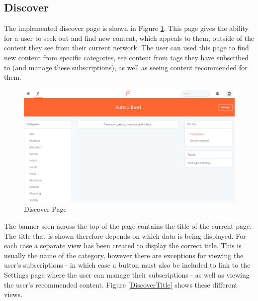 \subsection{Discover}
The implemented discover page is shown in Figure \ref{fig:DiscoverPage}. This page gives the ability for a user to seek out and find new content, which appeals to them, outside of the content they see from their current network. The user can used this page to find new content from specific categories, see content from tags they have subscribed to (and manage these subscriptions), as well as seeing content recommended for them.

\begin{figure}[H]
\centering
\includegraphics[width=\textwidth]{Images/Implementation/DiscoverPage}
\caption{Discover Page}
\label{fig:DiscoverPage}
\end{figure}
The banner seen across the top of the page contains the title of the current page. The title that is shown therefore depends on which data is being displayed. For each case a separate view has been created to display the correct title. This is usually the name of the category, however there are exceptions for viewing the user's subscriptions - in which case a button must also be included to link to the Settings page where the user can manage their subscriptions - as well as viewing the user's recommended content. Figure \ref{DiscoverTitle} shows these different views.


